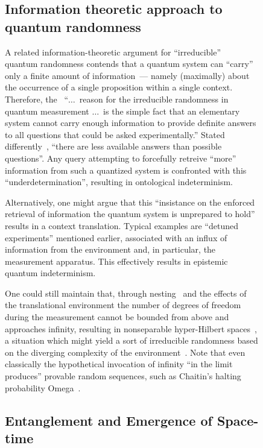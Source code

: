 \documentclass[entropy,article,accept,oneauthor,pdftex]{Definitions/mdpi}
\begin{document}
\begin{figure}[H]
\subsection{Information theoretic approach to quantum randomness}

A related information-theoretic argument for ``irreducible''~\cite{zeil-05_nature_ofQuantum}
quantum randomness contends that a quantum system can ``carry'' only a
finite amount of information~\cite{zeil-99,zeil-bruk-99a,zeil-bruk-99}--- namely (maximally) about the occurrence of a single proposition within a single context.
Therefore, the~\cite{zeil-99}
``$\ldots$~reason for the irreducible randomness in
quantum measurement $\ldots$~is the simple fact that an elementary system cannot carry enough information to provide definite answers to all questions
that could be asked experimentally.''
Stated differently~\cite{Grangier2018},  ``there are less available answers than possible questions''.
Any query attempting to forcefully retreive ``more'' information from such a quantized system is confronted with this ``underdetermination'',
resulting in ontological indeterminism.

Alternatively, one might argue that
this ``insistance on the enforced retrieval of information the quantum system is unprepared to hold'' results in a context translation.
Typical examples are ``detuned experiments'' mentioned earlier, associated with an influx of information from the environment and,
in particular, the measurement apparatus.
This effectively results in epistemic quantum indeterminism.

One could still maintain that, through nesting~\cite{everett,wigner:mb} and the effects
of the translational environment the number of degrees of freedom during the measurement cannot be bounded from above
and approaches infinity, resulting in nonseparable hyper-Hilbert spaces~\cite{vonNeumann1939}, a situation which might yield
a sort of irreducible randomness  based on the diverging complexity of the environment~\cite{Auffves2019}.
Note that even classically the hypothetical invocation of infinity ``in the limit produces'' provable random sequences, such as Chaitin's
halting probability Omega~\cite{calude-dinneen06}.




\subsection{Entanglement and Emergence of Space-time}


\end{figure}
\end{document}
